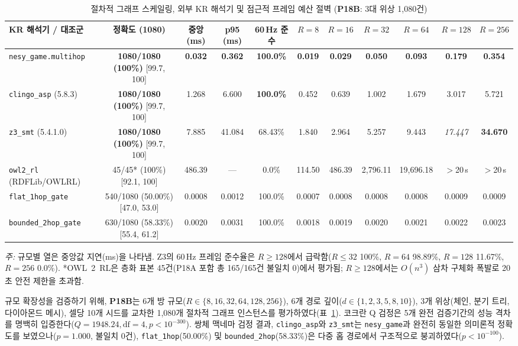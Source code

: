 \begin{table}[!tbp]
\caption{절차적 그래프 스케일링, 외부 KR 해석기 및 점근적 프레임 예산 절벽 (\textbf{P18B}: 3대 위상 1,080건)}
\label{tab:p18b}
\centering
\scriptsize
\setlength{\tabcolsep}{2.5pt}
\begin{tabularx}{\textwidth}{@{}>{\raggedright\arraybackslash}Xcccccccccc@{}}
\toprule
\textbf{KR 해석기 / 대조군} & \textbf{정확도 (1080)} & \textbf{중앙 (ms)} & \textbf{p95 (ms)} & \textbf{60\,Hz 준수} & \textbf{$R{=}8$} & \textbf{$R{=}16$} & \textbf{$R{=}32$} & \textbf{$R{=}64$} & \textbf{$R{=}128$} & \textbf{$R{=}256$} \\
\midrule
\texttt{nesy\_game.multihop} & \textbf{1080/1080 (100\%)} [99.7, 100] & \textbf{0.032} & \textbf{0.362} & \textbf{100.0\%} & \textbf{0.019} & \textbf{0.029} & \textbf{0.050} & \textbf{0.093} & \textbf{0.179} & \textbf{0.354} \\
\texttt{clingo\_asp} (5.8.3)~\cite{gebser2019clingo} & \textbf{1080/1080 (100\%)} [99.7, 100] & 1.268 & 6.600 & \textbf{100.0\%} & 0.452 & 0.639 & 1.002 & 1.679 & 3.017 & 5.721 \\
\texttt{z3\_smt} (5.4.1.0)~\cite{demoura2008z3} & \textbf{1080/1080 (100\%)} [99.7, 100] & 7.885 & 41.084 & 68.43\% & 1.840 & 2.964 & 5.257 & 9.443 & \textit{17.447} & \textbf{34.670} \\
\texttt{owl2\_rl} (RDFLib/OWLRL)~\cite{motik2012owl2profiles} & 45/45* (100\%) [92.1, 100] & 486.39 & --- & 0.0\% & 114.50 & 486.39 & 2,796.11 & 19,696.18 & $>$20\,s & $>$20\,s \\
\texttt{flat\_1hop\_gate} & 540/1080 (50.00\%) [47.0, 53.0] & 0.0008 & 0.0012 & 100.0\% & 0.0007 & 0.0008 & 0.0008 & 0.0008 & 0.0009 & 0.0009 \\
\texttt{bounded\_2hop\_gate} & 630/1080 (58.33\%) [55.4, 61.2] & 0.0020 & 0.0031 & 100.0\% & 0.0018 & 0.0019 & 0.0020 & 0.0021 & 0.0022 & 0.0023 \\
\bottomrule
\end{tabularx}
\vspace{1ex}
\raggedright\scriptsize\textit{주:} 규모별 열은 중앙값 지연(ms)을 나타냄. Z3의 60\,Hz 프레임 준수율은 $R{\ge}128$에서 급락함($R{\le}32$ 100\%, $R{=}64$ 98.89\%, $R{=}128$ 11.67\%, $R{=}256$ 0.0\%). *OWL~2~RL은 층화 표본 45건(P18A 포함 총 165/165건 불일치 0)에서 평가됨; $R{\ge}128$에서는 $O(n^3)$ 삼차 구체화 폭발로 20초 안전 제한을 초과함.
\end{table}

규모 확장성을 검증하기 위해, \textbf{P18B}는 6개 방 규모($R \in \{8, 16, 32, 64, 128, 256\}$), 6개 경로 깊이($d \in \{1, 2, 3, 5, 8, 10\}$), 3개 위상(체인, 분기 트리, 다이아몬드 메시), 셀당 10개 시드를 교차한 1,080개 절차적 그래프 인스턴스를 평가하였다(표~\ref{tab:p18b}). 코크란 Q 검정은 5개 완전 검증기간의 성능 격차를 명백히 입증한다($Q = 1948.24, \text{df}=4, p < 10^{-300}$). 쌍체 맥네마 검정 결과, \texttt{clingo\_asp}와 \texttt{z3\_smt}는 \texttt{nesy\_game}과 완전히 동일한 의미론적 정확도를 보였으나($p = 1.000$, 불일치 0건), \texttt{flat\_1hop}(50.00\%) 및 \texttt{bounded\_2hop}(58.33\%)은 다중 홉 경로에서 구조적으로 붕괴하였다($p < 10^{-100}$).

